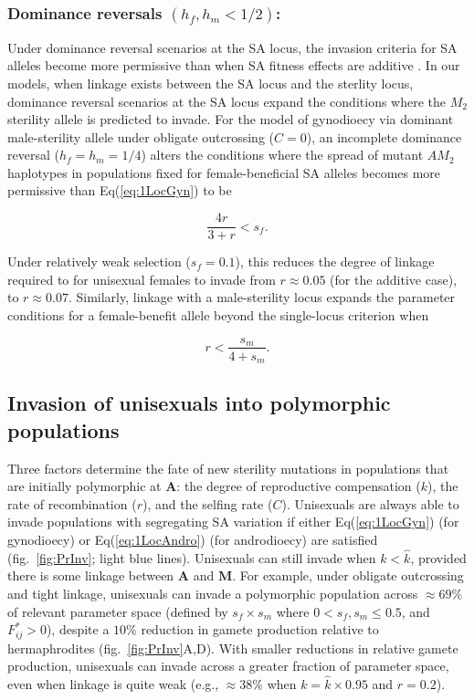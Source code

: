 \documentclass[9pt,twocolumn,twoside,lineno]{gsajnl}
\begin{document}
\subsubsection{Dominance reversals $(h_f,h_m < 1/2)$:} Under dominance reversal scenarios at the SA locus, the invasion criteria for SA alleles become more permissive than when SA fitness effects are additive \citep{Kidwell1977,ConnallonClark2012,JordanConnallon2014,Olito2016}. In our models, when linkage exists between the SA locus and the sterlity locus, dominance reversal scenarios at the SA locus expand the conditions where the $M_2$ sterility allele is predicted to invade. For the model of gynodioecy via dominant male-sterility allele under obligate outcrossing ($C=0$), an incomplete dominance reversal ($h_f=h_m=1/4$) alters the conditions where the spread of mutant $AM_2$ haplotypes in populations fixed for female-beneficial SA alleles becomes more permissive than Eq(\ref{eq:1LocGyn}) to be

\begin{equation}\label{eq:2LocGynDomRev}
	\frac{4 r}{3 + r} < s_f.
\end{equation}

\noindent Under relatively weak selection ($s_f=0.1$), this reduces the degree of linkage required to for unisexual females to invade from $r \approx 0.05$ (for the additive case), to $r \approx 0.07$. Similarly, linkage with a male-sterility locus expands the parameter conditions for a female-benefit allele beyond the single-locus criterion when

\begin{equation}\label{eq:2LocGynDomRevSA}
	r < \frac{s_m}{4 + s_m}.
\end{equation}


\subsection{Invasion of unisexuals into polymorphic populations}

Three factors determine the fate of new sterility mutations in populations that are initially polymorphic at $\mathbf{A}$: the degree of reproductive compensation ($k$), the rate of recombination ($r$), and the selfing rate ($C$). Unisexuals are always able to invade populations with segregating SA variation if either Eq(\ref{eq:1LocGyn}) (for gynodioecy) or Eq(\ref{eq:1LocAndro}) (for androdioecy) are satisfied (fig.~\ref{fig:PrInv}; light blue lines). Unisexuals can still invade when $k < \hat{k}$, provided there is some linkage between $\mathbf{A}$ and $\mathbf{M}$. For example, under obligate outcrossing and tight linkage, unisexuals can invade a polymorphic population across $\approx 69\%$ of relevant parameter space (defined by $s_f \times s_m$ where $0 < s_f,s_m \leq 0.5$, and $F^{\ast}_{ij} > 0$), despite a $10\%$ reduction in gamete production relative to hermaphrodites (fig.~\ref{fig:PrInv}A,D). With smaller reductions in relative gamete production, unisexuals can invade across a greater fraction of parameter space, even when linkage is quite weak (e.g., $\approx 38\%$ when $k = \hat{k} \times 0.95 $ and $r = 0.2$). 
\end{document}
